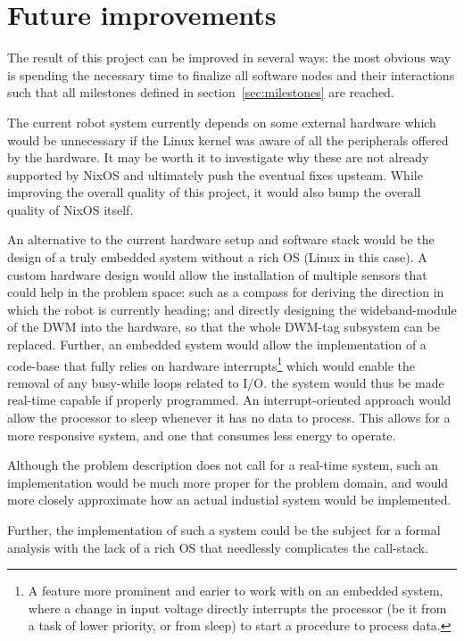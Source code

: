 \section{Future improvements}
\label{sec:improvements}
The result of this project can be improved in several ways: the most
obvious way is spending the necessary time to finalize all software
nodes and their interactions such that all milestones defined in
section~\ref{sec:milestones} are reached.

The current robot system currently depends on some external hardware
which would be unnecessary if the Linux kernel was aware of all the
peripherals offered by the hardware. It may be worth it to investigate
why these are not already supported by NixOS and ultimately push the
eventual fixes upsteam. While improving the overall quality of this
project, it would also bump the overall quality of NixOS itself.

An alternative to the current hardware setup and software stack would be
the design of a truly embedded system without a rich OS (Linux in this
case). A custom hardware design would allow the installation of multiple
sensors that could help in the problem space: such as a compass for
deriving the direction in which the robot is currently heading; and
directly designing the wideband-module of the DWM into the hardware, so
that the whole DWM-tag subsystem can be replaced. Further, an embedded
system would allow the implementation of a code-base that fully relies
on hardware interrupts\footnote{A feature more prominent and earier to
  work with on an embedded system, where a change in input voltage
  directly interrupts the processor (be it from a task of lower
  priority, or from sleep) to start a procedure to process data.} which
would enable the removal of any busy-while loops related to I/O. the
system would thus be made real-time capable if properly programmed. An
interrupt-oriented approach would allow the processor to sleep whenever
it has no data to process. This allows for a more responsive system, and
one that consumes less energy to operate.

Although the problem description does not call for a real-time system,
such an implementation would be much more proper for the problem domain,
and would more closely approximate how an actual industial system would
be implemented.

Further, the implementation of such a system could be the subject for a
formal analysis with the lack of a rich OS that needlessly complicates
the call-stack.

